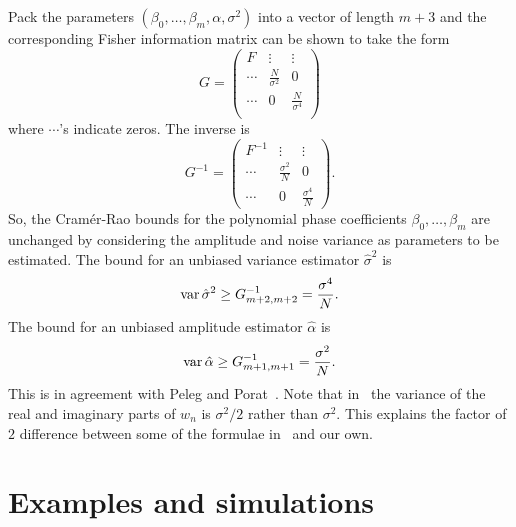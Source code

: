 \documentclass[review]{elsarticle}
\begin{document}
Pack the parameters $(\beta_0, \dots, \beta_m,\alpha,\sigma^2)$ into a vector of length $m+3$ and the corresponding Fisher information matrix can be shown to take the form
\[
G = \left( \begin{array}{ccc}
F & \vdots & \vdots \\
\cdots & \frac{N}{\sigma^2} & 0\\
\cdots & 0 & \frac{N}{\sigma^4} \\
\end{array}\right)
\]
where $\cdots$'s indicate zeros.  The inverse is
\[
G^{-1} = \left( \begin{array}{ccc}
F^{-1} & \vdots & \vdots \\
\cdots & \frac{\sigma^2}{N} & 0 \\
\cdots & 0 & \frac{\sigma^4}{N}
\end{array} \right).
\]
So, the Cram\'{e}r-Rao bounds for the polynomial phase coefficients $\beta_0, \dots, \beta_m$ are unchanged by considering the amplitude and noise variance as parameters to be estimated.  The bound for an unbiased variance estimator $\hat{\sigma}^2$ is
\[
\operatorname{var} \hat{\sigma}^2 \geq G_{m+2,m+2}^{-1} = \frac{\sigma^4}{N}.
\]
The bound for an unbiased amplitude estimator $\hat{\alpha}$ is
\[
\operatorname{var} \hat{\alpha} \geq G_{m+1,m+1}^{-1} = \frac{\sigma^2}{N}.
\]
This is in agreement with Peleg and Porat~\cite{Peleg1991_CRB_PPS_1991}.  Note that in~\cite{Peleg1991_CRB_PPS_1991} the variance of the real and imaginary parts of $w_n$ is $\sigma^2/2$ rather than $\sigma^2$.  This explains the factor of $2$ difference between some of the formulae in~\cite{Peleg1991_CRB_PPS_1991} and our own.

\section{Examples and simulations}\label{sec:simuations}
\end{document}
